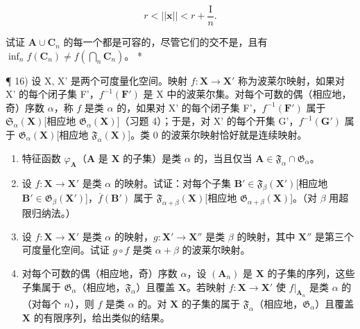 \[
r <   | | \boldsymbol {x} | | <   r + \frac {\mathrm{I}}{n}.
\]

试证 \(\mathbf{A} \cup \mathbf{C}_n\) 的每一个都是可容的，尽管它们的交不是，且有 \(\inf_n f(\mathbf{C}_n) \neq f\left(\bigcap_n \mathbf{C}_n\right)\)。 *

¶ 16) 设 X, X' 是两个可度量化空间。映射 \(f: \mathbf{X} \to \mathbf{X}'\) 称为波莱尔映射，如果对 X' 的每个闭子集 F'，\(f^{-1}(\mathbf{F}')\) 是 X 中的波莱尔集。对每个可数的偶（相应地，奇）序数 \(\alpha\)，称 \(f\) 是类 \(\alpha\) 的，如果对 X' 的每个闭子集 F'，\(f^{-1}(\mathbf{F}')\) 属于 \(\mathfrak{S}_{\alpha}(\mathbf{X})\){[}相应地 \(\mathfrak{G}_{\alpha}(\mathbf{X})\){]}（习题 4）；于是，对 X' 的每个开集 G'，\(f^{-1}(\mathbf{G}')\) 属于 \(\mathfrak{G}_{\alpha}(\mathbf{X})\){[}相应地 \(\mathfrak{F}_{\alpha}(\mathbf{X})\){]}。类 0 的波莱尔映射恰好就是连续映射。

\begin{enumerate}
\def\labelenumi{\alph{enumi})}
\item
  特征函数 \(\varphi_{\mathbf{A}}\)（\(\mathbf{A}\) 是 \(\mathbf{X}\) 的子集）是类 \(\alpha\) 的，当且仅当 \(\mathbf{A} \in \mathfrak{F}_{\alpha} \cap \mathfrak{G}_{\alpha}\)。
\item
  设 \(f: \mathbf{X} \to \mathbf{X}'\) 是类 \(\alpha\) 的映射。试证：对每个子集 \(\mathbf{B}' \in \mathfrak{F}_{\beta}(\mathbf{X}')\){[}相应地 \(\mathbf{B}' \in \mathfrak{G}_{\beta}(\mathbf{X}')\){]}，\(\overline{f}(\mathbf{B}')\) 属于 \(\mathfrak{F}_{\alpha + \beta}(\mathbf{X})\){[}相应地 \(\mathfrak{G}_{\alpha + \beta}(\mathbf{X})\){]}。（对 \(\beta\) 用超限归纳法。）
\item
  设 \(f: \mathbf{X} \to \mathbf{X}'\) 是类 \(\alpha\) 的映射，\(g: \mathbf{X}' \to \mathbf{X}''\) 是类 \(\beta\) 的映射，其中 \(\mathbf{X}''\) 是第三个可度量化空间。试证 \(g \circ f\) 是类 \(\alpha + \beta\) 的波莱尔映射。
\item
  对每个可数的偶（相应地，奇）序数 \(\alpha\)，设 \((\mathbf{A}_n)\) 是 \(\mathbf{X}\) 的子集的序列，这些子集属于 \(\mathfrak{G}_{\alpha}\)（相应地，\(\mathfrak{F}_{\alpha}\)）且覆盖 \(\mathbf{X}\)。若映射 \(f: \mathbf{X} \to \mathbf{X}'\) 使 \(f|_{\mathbf{A}_n}\) 是类 \(\alpha\) 的（对每个 \(n\)），则 \(f\) 是类 \(\alpha\) 的。对 \(\mathbf{X}\) 的子集的属于 \(\mathfrak{F}_{\alpha}\)（相应地，\(\mathfrak{G}_{\alpha}\)）且覆盖 \(\mathbf{X}\) 的有限序列，给出类似的结果。
\end{enumerate}


